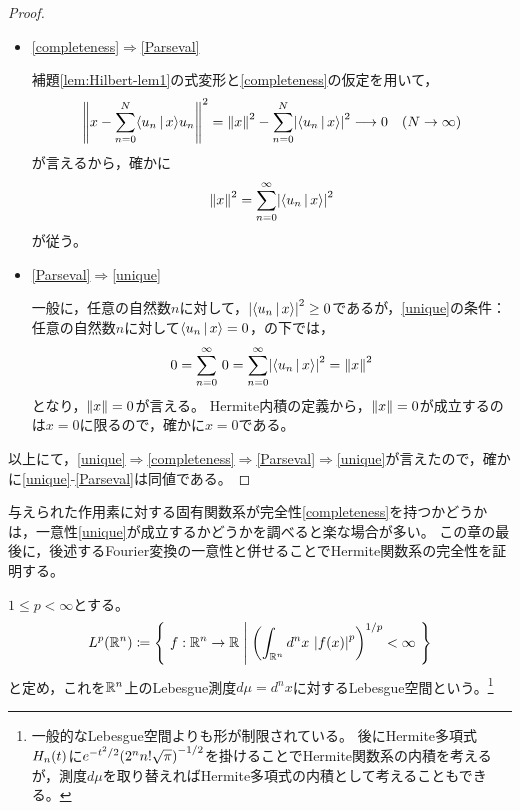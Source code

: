 \documentclass[a4paper,draft]{ltjsarticle}
\begin{document}
\begin{prop}[完全性と同値な命題]
\begin{proof}
\begin{itemize}
            \item \ref{completeness}$\Rightarrow$\ref{Parseval}

            補題\ref{lem:Hilbert-lem1}の式変形と\ref{completeness}の仮定を用いて，
            \begin{equation}
                \norm{x-\sum_{n=0}^N\inner{u_n}{x}u_n}^2
                =\norm{x}^2-\sum_{n=0}^N\abs{\inner{u_n}{x}}^2\longrightarrow 0 \quad \pare{N\to\infty}
            \end{equation}
            が言えるから，確かに
            \begin{equation}
                \norm{x}^2=\sum_{n=0}^\infty \abs{\inner{u_n}{x}}^2
            \end{equation}
            が従う。

            \item \ref{Parseval}$\Rightarrow$\ref{unique}
            
            一般に，任意の自然数$n$に対して，$\abs{\inner{u_n}{x}}^2\geq0$であるが，\ref{unique}の条件：任意の自然数$n$に対して$\inner{u_n}{x}=0$，の下では，
            \begin{equation}
                0=\sum_{n=0}^\infty \, 0 = \sum_{n=0}^\infty \abs{\inner{u_n}{x}}^2=\norm{x}^2
            \end{equation}
            となり，$\norm{x}=0$が言える。
            Hermite内積の定義から，$\norm{x}=0$が成立するのは$x=0$に限るので，確かに$x=0$である。
        \end{itemize}

        以上にて，\ref{unique}$\Rightarrow$\ref{completeness}$\Rightarrow$\ref{Parseval}$\Rightarrow$\ref{unique}が言えたので，確かに\ref{unique}-\ref{Parseval}は同値である。
    \end{proof}
\end{prop}

与えられた作用素に対する固有関数系が完全性\ref{completeness}を持つかどうかは，一意性\ref{unique}が成立するかどうかを調べると楽な場合が多い。
この章の最後に，後述するFourier変換の一意性と併せることでHermite関数系の完全性を証明する。

\begin{defi}[Lebesgue空間]
    $1\leq p<\infty$とする。
    \begin{equation}
        \fun{L^p}{\R^n}\coloneqq\set{
            f:\R^n\to\R
        }{
            \pare{\int_{\R^n} d^nx\ \abs{\fun{f}{x}}^p}^{1/p}<\infty
        }
    \end{equation}
    と定め，これを$\mathbb{R}^n$上のLebesgue測度$d\mu=d^n x$に対するLebesgue空間という。\footnote{一般的なLebesgue空間よりも形が制限されている。
    後にHermite多項式$\fun{H_n}{t}$に$e^{-t^2/2}\pare{2^n n!\sqrt{\pi}}^{-1/2}$を掛けることでHermite関数系の内積を考えるが，測度$d\mu$を取り替えればHermite多項式の内積として考えることもできる。}
\end{defi}
\end{document}
